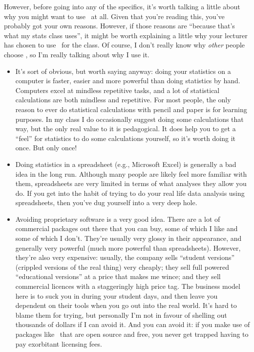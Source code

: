 However, before going into any of the specifics, it's worth talking a little about why you might want to use \R\ at all. Given that you're reading this, you've probably got your own reasons. However, if those reasons are ``because that's what my stats class uses'', it might be worth explaining a little why your lecturer has chosen to use \R\ for the class. Of course, I don't really know why {\it other} people choose \R, so I'm really talking about why I use it.
\begin{itemize}
\item It's sort of obvious, but worth saying anyway: doing your statistics on a computer is faster, easier and more powerful than doing statistics by hand. Computers excel at mindless repetitive tasks, and a lot of statistical calculations are both mindless and repetitive. For most people, the only reason to ever do statistical calculations with pencil and paper is for learning purposes. In my class I do occasionally suggest doing some calculations that way, but the only real value to it is pedagogical. It does help you to get a ``feel'' for statistics to do some calculations yourself, so it's worth doing it once. But only once!
\item Doing statistics in a spreadsheet (e.g., Microsoft Excel) is generally a bad idea in the long run. Although many people are likely feel more familiar with them, spreadsheets are very limited in terms of what analyses they allow you do. If you get into the habit of trying to do your real life data analysis using spreadsheets, then you've dug yourself into a very deep hole.
\item Avoiding proprietary software is a very good idea. There are a lot of commercial packages out there that you can buy, some of which I like and some of which I don't. They're usually very glossy in their appearance, and generally very powerful (much more powerful than spreadsheets). However, they're also very expensive: usually, the company sells ``student versions'' (crippled versions of the real thing) very cheaply; they sell full powered ``educational versions'' at a price that makes me wince; and they sell commercial licences with a staggeringly high price tag. The business model here is to suck you in during your student days, and then leave you dependent on their tools when you go out into the real world. It's hard to blame them for trying, but personally I'm not in favour of shelling out thousands of dollars if I can avoid it. And you can avoid it: if you make use of packages like \R\ that are open source and free, you never get trapped having to pay exorbitant licensing fees. 

\end{itemize}
